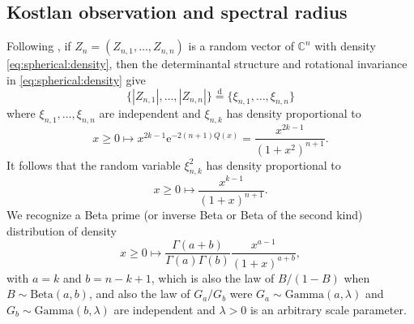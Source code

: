 \documentclass[10pt,reqno]{amsart}
\newcommand{\dd}{\mathrm{d}}
\newcommand{\<}{\langle}
\renewcommand{\>}{\rangle}
\newcommand{\MG}{M^{\mathrm{Gin}}}
\numberwithin{equation}{section}
\begin{document}
\subsection{Kostlan observation and spectral radius}

Following \cite{MR1148410,MR2552864}, if $Z_n=(Z_{n,1},\ldots,Z_{n,n})$ is a random vector of $\mathbb{C}^n$ with density \eqref{eq:spherical:density}, then the determinantal structure and rotational invariance in \eqref{eq:spherical:density} give 
\begin{equation}\label{eq:kostlan:spherical}
\{|Z_{n,1}|,\ldots,|Z_{n,n}|\}\overset{\dd}{=}\{\xi_{n,1},\ldots,\xi_{n,n}\}
\end{equation}
where $\xi_{n,1},\ldots,\xi_{n,n}$ are independent and $\xi_{n,k}$ has density proportional to 
\begin{equation}
    x\geq0\mapsto x^{2k-1}\mathrm{e}^{-2(n+1)Q(x)}=\frac{x^{2k-1}}{(1+x^2)^{n+1}}.
\end{equation}
It follows that the random variable $\xi_{n,k}^2$ has density proportional to
\begin{equation}\label{eq:xi2}
  x\geq0\mapsto\frac{x^{k-1}}{(1+x)^{n+1}}.
\end{equation}
We recognize a Beta prime (or inverse Beta or Beta of the second kind)
distribution of density
\begin{equation}
  x\geq0\mapsto\frac{\Gamma(a+b)}{\Gamma(a)\Gamma(b)}\frac{x^{a-1}}{(1+x)^{a+b}},
\end{equation}
with $a=k$ and $b=n-k+1$, which is also the law of $B/(1-B)$ when
$B\sim\mathrm{Beta}(a,b)$, and also the law of $G_a/G_b$ were
$G_a\sim\mathrm{Gamma}(a,\lambda)$ and $G_b\sim\mathrm{Gamma}(b,\lambda)$ are
independent and $\lambda>0$ is an arbitrary scale parameter.
\end{document}
